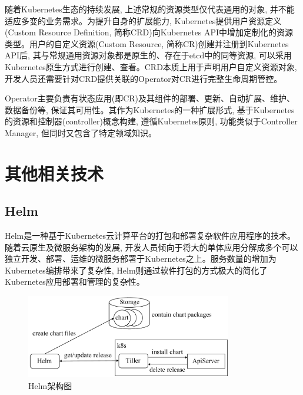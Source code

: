 随着Kubernetes生态的持续发展, 上述常规的资源类型仅代表通用的对象, 并不能适应多变的业务需求。为提升自身的扩展能力, Kubernetes提供用户资源定义(Custom Resource Definition, 简称CRD)向Kubernetes API中增加定制化的资源类型。用户的自定义资源(Custom Resource, 简称CR)创建并注册到Kubernetes API后, 其与常规通用资源对象都是原生的、存在于etcd中的同等资源, 可以采用Kubernetes原生方式进行创建、查看。CRD本质上用于声明用户自定义资源对象, 开发人员还需要针对CRD提供关联的Operator对CR进行完整生命周期管控。

Operator主要负责有状态应用(即CR)及其组件的部署、更新、自动扩展、维护、数据备份等, 保证其可用性。其作为Kubernetes的一种扩展形式, 基于Kubernetes的资源和控制器(controller)概念构建, 遵循Kubernetes原则, 功能类似于Controller Manager, 但同时又包含了特定领域知识。

\section{其他相关技术}\label{section: other_technologies}

\subsection{Helm}

Helm是一种基于Kubernetes云计算平台的打包和部署复杂软件应用程序的技术\cite{spillner2019quality}。随着云原生及微服务架构的发展, 开发人员倾向于将大的单体应用分解成多个可以独立开发、部署、运维的微服务部署于Kubernetes之上。服务数量的增加为Kubernetes编排带来了复杂性, Helm则通过软件打包的方式极大的简化了Kubernetes应用部署和管理的复杂性。

\begin{figure}[h] %
    \centering %
    \includegraphics[width=0.8\textwidth]{FIGs/chapter2/helm.pdf} %
    \caption{Helm架构图} %
    \label{helm} %
\end{figure}%

